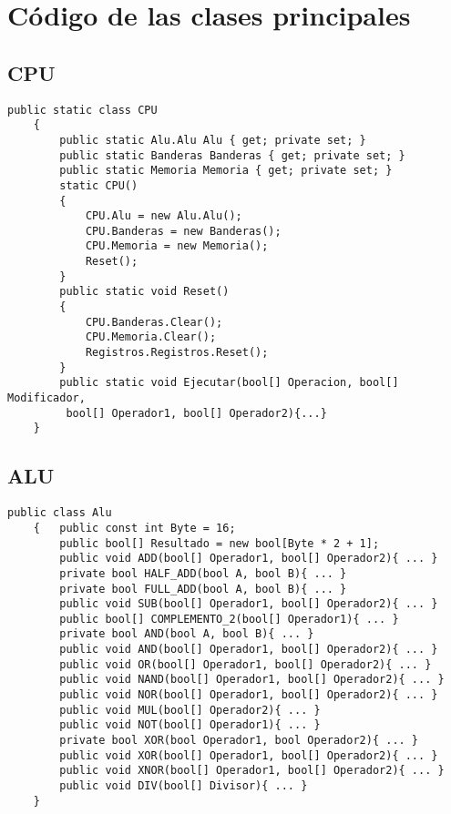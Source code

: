 \documentclass{scrartcl}
\begin{document}
\section{Código de las clases principales}

\subsection{CPU}
\begin{lstlisting}[language={[Sharp]C}, title={CPU}]
    public static class CPU
    {
        public static Alu.Alu Alu { get; private set; }
        public static Banderas Banderas { get; private set; }
        public static Memoria Memoria { get; private set; }
        static CPU()
        {
            CPU.Alu = new Alu.Alu();
            CPU.Banderas = new Banderas();
            CPU.Memoria = new Memoria();
            Reset();
        }
        public static void Reset()
        {
            CPU.Banderas.Clear();
            CPU.Memoria.Clear();
            Registros.Registros.Reset();
        }
        public static void Ejecutar(bool[] Operacion, bool[] Modificador,
         bool[] Operador1, bool[] Operador2){...}
    }
\end{lstlisting}
\subsection{ALU}
\begin{lstlisting}[language={[Sharp]C}, title={ALU}]
    public class Alu
    {   public const int Byte = 16;
        public bool[] Resultado = new bool[Byte * 2 + 1];
        public void ADD(bool[] Operador1, bool[] Operador2){ ... }  
        private bool HALF_ADD(bool A, bool B){ ... }  
        private bool FULL_ADD(bool A, bool B){ ... }  
        public void SUB(bool[] Operador1, bool[] Operador2){ ... }  
        public bool[] COMPLEMENTO_2(bool[] Operador1){ ... }  
        private bool AND(bool A, bool B){ ... }  
        public void AND(bool[] Operador1, bool[] Operador2){ ... }  
        public void OR(bool[] Operador1, bool[] Operador2){ ... }  
        public void NAND(bool[] Operador1, bool[] Operador2){ ... }  
        public void NOR(bool[] Operador1, bool[] Operador2){ ... }  
        public void MUL(bool[] Operador2){ ... }  
        public void NOT(bool[] Operador1){ ... }  
        private bool XOR(bool Operador1, bool Operador2){ ... }  
        public void XOR(bool[] Operador1, bool[] Operador2){ ... }  
        public void XNOR(bool[] Operador1, bool[] Operador2){ ... }  
        public void DIV(bool[] Divisor){ ... }         
    }
\end{lstlisting}
\newpage
\end{document}
